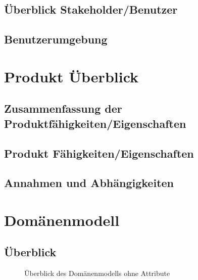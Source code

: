 \documentclass[a4paper,12pt,twoside]{scrreprt}
\begin{document}
    \section{Überblick Stakeholder/Benutzer}
    \section{Benutzerumgebung}
    

    \chapter{Produkt Überblick}
    
    \section{Zusammenfassung der Produktfähigkeiten/Eigenschaften}
    
    \section{Produkt Fähigkeiten/Eigenschaften}
    


    \section{Annahmen und Abhängigkeiten}

    \chapter{Domänenmodell}
    \section{Überblick}
    \begin{figure}[ht!]
        \begin{center}
            \caption{Überblick des Domänenmodells ohne Attribute}\label{domainmodel}
        \end{center}
    \end{figure}
    \newpage
\end{document}
